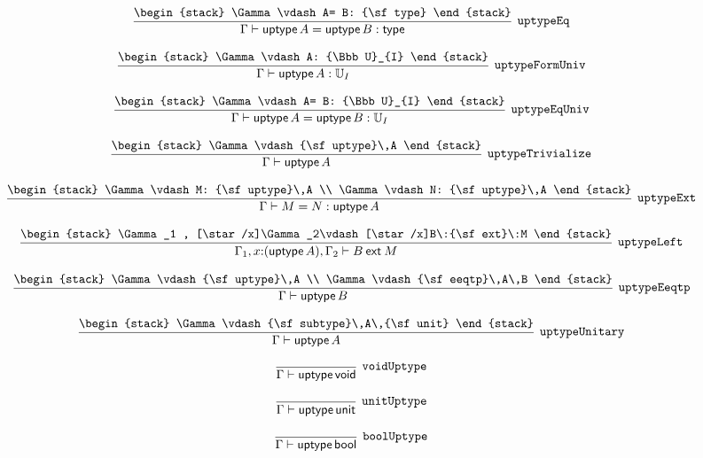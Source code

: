 \[
\infer[{\tt uptypeEq}]{\Gamma \vdash {\sf uptype}\,A= {\sf uptype}\,B: {\sf type}}{
\begin{stack}
\Gamma \vdash A= B: {\sf type}
\end{stack}}
\]

\[
\infer[{\tt uptypeFormUniv}]{\Gamma \vdash {\sf uptype}\,A: {\Bbb U}_{I}}{
\begin{stack}
\Gamma \vdash A: {\Bbb U}_{I}
\end{stack}}
\]

\[
\infer[{\tt uptypeEqUniv}]{\Gamma \vdash {\sf uptype}\,A= {\sf uptype}\,B: {\Bbb U}_{I}}{
\begin{stack}
\Gamma \vdash A= B: {\Bbb U}_{I}
\end{stack}}
\]

\[
\infer[{\tt uptypeTrivialize}]{\Gamma \vdash {\sf uptype}\,A}{
\begin{stack}
\Gamma \vdash {\sf uptype}\,A
\end{stack}}
\]

\[
\infer[{\tt uptypeExt}]{\Gamma \vdash M= N: {\sf uptype}\,A}{
\begin{stack}
\Gamma \vdash M: {\sf uptype}\,A
\\
\Gamma \vdash N: {\sf uptype}\,A
\end{stack}}
\]

\[
\infer[{\tt uptypeLeft}]{\Gamma_1 ,x\mathord{:}({\sf uptype}\,A), \Gamma_2 \vdash B\:{\sf ext}\:M}{
\begin{stack}
\Gamma_1 , [\star /x]\Gamma_2\vdash [\star /x]B\:{\sf ext}\:M
\end{stack}}
\]

\[
\infer[{\tt uptypeEeqtp}]{\Gamma \vdash {\sf uptype}\,B}{
\begin{stack}
\Gamma \vdash {\sf uptype}\,A
\\
\Gamma \vdash {\sf eeqtp}\,A\,B
\end{stack}}
\]

\[
\infer[{\tt uptypeUnitary}]{\Gamma \vdash {\sf uptype}\,A}{
\begin{stack}
\Gamma \vdash {\sf subtype}\,A\,{\sf unit}
\end{stack}}
\]

\[
\infer[{\tt voidUptype}]{\Gamma \vdash {\sf uptype}\,{\sf void}}{}
\]

\[
\infer[{\tt unitUptype}]{\Gamma \vdash {\sf uptype}\,{\sf unit}}{}
\]

\[
\infer[{\tt boolUptype}]{\Gamma \vdash {\sf uptype}\,{\sf bool}}{}
\]

